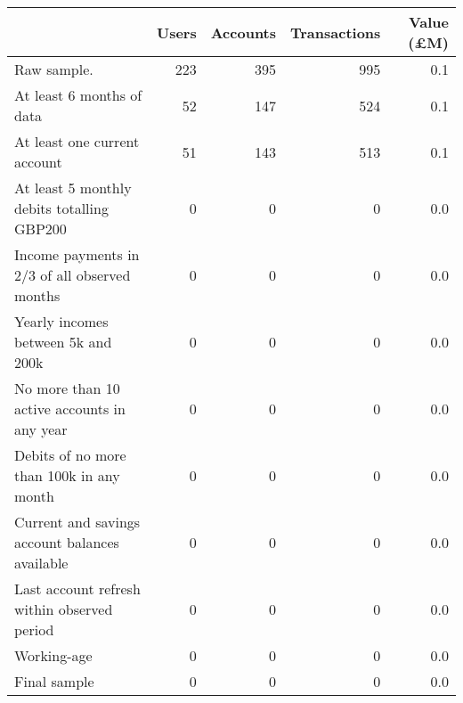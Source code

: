 \begin{tabular}{lrrrr}
\toprule
                                               & Users & Accounts & Transactions & Value (\pounds M) \\
\midrule
                                   Raw sample. &   223 &      395 &          995 &               0.1 \\
                     At least 6 months of data &    52 &      147 &          524 &               0.1 \\
                  At least one current account &    51 &      143 &          513 &               0.1 \\
    At least 5 monthly debits totalling GBP200 &     0 &        0 &            0 &               0.0 \\
 Income payments in 2/3 of all observed months &     0 &        0 &            0 &               0.0 \\
            Yearly incomes between 5k and 200k &     0 &        0 &            0 &               0.0 \\
   No more than 10 active accounts in any year &     0 &        0 &            0 &               0.0 \\
      Debits of no more than 100k in any month &     0 &        0 &            0 &               0.0 \\
Current and savings account balances available &     0 &        0 &            0 &               0.0 \\
   Last account refresh within observed period &     0 &        0 &            0 &               0.0 \\
                                   Working-age &     0 &        0 &            0 &               0.0 \\
                                  Final sample &     0 &        0 &            0 &               0.0 \\
\bottomrule
\end{tabular}
